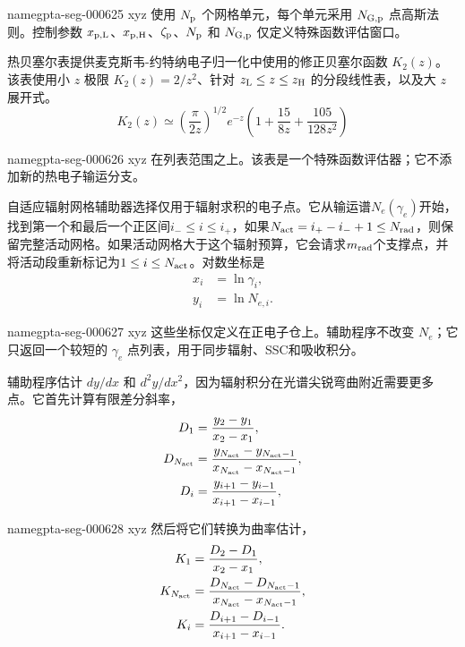 \documentclass[twocolumn]{aastex702}
\makeatletter
\providecommand{\gptareaderanchor}[1]{\pdfdest name{#1} xyz}%
\providecommand{\gptareaderanchor}[1]{\special{pdf:dest (#1) [ @thispage /XYZ @xpos @ypos null ]}}%
\makeatother
\begin{document}
\gptareaderanchor{gpta-seg-000625}%
使用 \(N_{\rm p}\) 个网格单元，每个单元采用 \(N_{\rm G,p}\) 点高斯法则。控制参数 \(x_{\rm p,L}\)、\(x_{\rm p,H}\)、\(\zeta_{\rm p}\)、\(N_{\rm p}\) 和 \(N_{\rm G,p}\) 仅定义特殊函数评估窗口。

热贝塞尔表提供麦克斯韦-约特纳电子归一化中使用的修正贝塞尔函数 \(K_2(z)\)。该表使用小 \(z\) 极限 \(K_2(z)=2/z^2\)、针对 \(z_{\rm L}\le z\le z_{\rm H}\) 的分段线性表，以及大 \(z\) 展开式。
\begin{equation}
K_2(z)\simeq
\left(\frac{\pi}{2z}\right)^{1/2}e^{-z}
\left(1+\frac{15}{8z}+\frac{105}{128z^2}\right)
\end{equation}

\gptareaderanchor{gpta-seg-000626}%
在列表范围之上。该表是一个特殊函数评估器；它不添加新的热电子输运分支。

自适应辐射网格辅助器选择仅用于辐射求积的电子点。它从输运谱\(N_e(\gamma_e)\)开始，找到第一个和最后一个正区间\(i_-\le i\le i_+\)，如果\(N_{\rm act}=i_+-i_-+1\le N_{\rm rad}\)，则保留完整活动网格。如果活动网格大于这个辐射预算，它会请求\(m_{\rm rad}\)个支撑点，并将活动段重新标记为\(1\le i\le N_{\rm act}\)。对数坐标是
\begin{equation}
\begin{aligned}
x_i&=\ln\gamma_i,\\
y_i&=\ln N_{e,i}.
\end{aligned}
\end{equation}

\gptareaderanchor{gpta-seg-000627}%
这些坐标仅定义在正电子仓上。辅助程序不改变 \(N_e\)；它只返回一个较短的 \(\gamma_e\) 点列表，用于同步辐射、SSC和吸收积分。

辅助程序估计 \(dy/dx\) 和 \(d^2y/dx^2\)，因为辐射积分在光谱尖锐弯曲附近需要更多点。它首先计算有限差分斜率，
\begin{equation}
\begin{aligned}
D_1&=\frac{y_2-y_1}{x_2-x_1},\\
D_{N_{\rm act}}&=\frac{y_{N_{\rm act}}-y_{N_{\rm act}-1}}
{x_{N_{\rm act}}-x_{N_{\rm act}-1}},\\
D_i&=\frac{y_{i+1}-y_{i-1}}{x_{i+1}-x_{i-1}},
\end{aligned}
\end{equation}

\gptareaderanchor{gpta-seg-000628}%
然后将它们转换为曲率估计，
\begin{equation}
\begin{aligned}
K_1&=\frac{D_2-D_1}{x_2-x_1},\\
K_{N_{\rm act}}&=\frac{D_{N_{\rm act}}-D_{N_{\rm act}-1}}
{x_{N_{\rm act}}-x_{N_{\rm act}-1}},\\
K_i&=\frac{D_{i+1}-D_{i-1}}{x_{i+1}-x_{i-1}} .
\end{aligned}
\end{equation}
\end{document}
